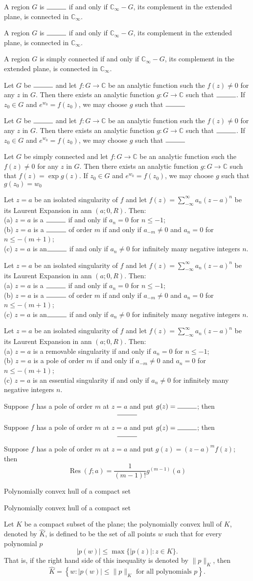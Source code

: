 \documentclass[17pt]{extarticle}
\newcommand{\boxset}[2]{\begin{mdframed}[style=darkQuesion]
#1
\end{mdframed}
\newpage
\begin{mdframed}[style=darkQuesion]
#1
  \end{mdframed}
\begin{mdframed}[style=darkAnswer]
#2
  \end{mdframed}
  \newpage
}
\begin{document}
\boxset{   A region $G$ is $\rule{1cm}{0.15mm}$ if and only if $\mathbb{C}_{\infty}-G$, its complement in the extended plane, is connected in $\mathbb{C}_{\infty}$.  }
{A region $G$ is simply connected if and only if $\mathbb{C}_{\infty}-G$, its complement in the extended plane, is connected in $\mathbb{C}_{\infty}$.}%
\boxset{   Let $G$ be $\rule{1cm}{0.15mm}$ and let $f: G \rightarrow \mathbb{C}$ be an analytic function such the $f(z) \neq 0$ for any $z$ in $G$. Then there exists an analytic function $g: G \rightarrow \mathbb{C}$ such that $\rule{1cm}{0.15mm}$. If $z_{0} \in G$ and $e^{w_{0}}=f\left(z_{0}\right)$, we may choose $g$ such that $\rule{1cm}{0.15mm}$  }
{   Let $G$ be simply connected and let $f: G \rightarrow \mathbb{C}$ be an analytic function such the $f(z) \neq 0$ for any $z$ in $G$. Then there exists an analytic function $g: G \rightarrow \mathbb{C}$ such that $f(z)=\exp g(z)$. If $z_{0} \in G$ and $e^{w_{0}}=f\left(z_{0}\right)$, we may choose $g$ such that $g\left(z_{0}\right)=w_{0}$ }%
\boxset{Let $z=a$ be an isolated singularity of $f$ and let $f(z)=\sum_{-\infty}^{\infty} a_{n}(z-a)^{n}$ be its Laurent Expansion in ann $(a ; 0, R)$. Then:\[\ \] (a) $z=a$ is a $\rule{1cm}{0.15mm}$ if and only if $a_{n}=0$ for $n \leq-1$;\[\ \] (b) $z=a$ is a $\rule{1cm}{0.15mm}$ of order $m$ if and only if $a_{-m} \neq 0$ and $a_{n}=0$ for $n \leq-(m+1)$;\[\ \] (c) $z=a$ is an$\rule{1cm}{0.15mm}$ if and only if $a_{n} \neq 0$ for infinitely many negative integers $n$. }
{Let $z=a$ be an isolated singularity of $f$ and let $f(z)=\sum_{-\infty}^{\infty} a_{n}(z-a)^{n}$ be its Laurent Expansion in ann $(a ; 0, R)$. Then:\[\ \] (a) $z=a$ is a removable singularity if and only if $a_{n}=0$ for $n \leq-1$;\[\ \] (b) $z=a$ is a pole of order $m$ if and only if $a_{-m} \neq 0$ and $a_{n}=0$ for $n \leq-(m+1)$;\[\ \] (c) $z=a$ is an essential singularity if and only if $a_{n} \neq 0$ for infinitely many negative integers $n$.}%
\boxset{Suppose $f$ has a pole of order $m$ at $z=a$ and put $g(z)=\rule{1cm}{0.15mm}$; then \[\rule{1cm}{0.15mm}\] }
{   Suppose $f$ has a pole of order $m$ at $z=a$ and put $g(z)=(z-a)^{m} f(z)$; then \[\operatorname{Res}(f ; a)=\frac{1}{(m-1) !} g^{(m-1)}(a)\] }%
\boxset{Polynomially convex hull of a compact set}
{Let $K$ be a compact subset of the plane; the polynomially convex hull of $K$, denoted by $\hat{K}$, is defined to be the set of all points $w$ such that for every polynomial $p$\[|p(w)| \leq \max \{|p(z)|: z \in K\} .\] That is, if the right hand side of this inequality is denoted by $\|p\|_{K}$, then \[\hat{K}=\left\{w:|p(w)| \leq\|p\|_{K} \text { for all polynomials } p\right\} .\]}%
\end{document}
